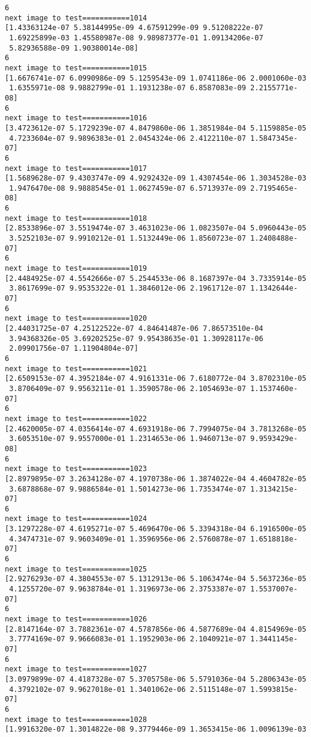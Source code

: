 \documentclass[11pt]{article}
\begin{document}
\begin{Verbatim}[commandchars=\\\{\}]
6
next image to test===========1014
[1.43363124e-07 5.38144995e-09 4.67591299e-09 9.51208222e-07
 1.69225899e-03 1.45580987e-08 9.98987377e-01 1.09134206e-07
 5.82936588e-09 1.90380014e-08]
6
next image to test===========1015
[1.6676741e-07 6.0990986e-09 5.1259543e-09 1.0741186e-06 2.0001060e-03
 1.6355971e-08 9.9882799e-01 1.1931238e-07 6.8587083e-09 2.2155771e-08]
6
next image to test===========1016
[3.4723612e-07 5.1729239e-07 4.8479860e-06 1.3851984e-04 5.1159885e-05
 4.7233604e-07 9.9896383e-01 2.0454324e-06 2.4122110e-07 1.5847345e-07]
6
next image to test===========1017
[1.5689628e-07 9.4303747e-09 4.9292432e-09 1.4307454e-06 1.3034528e-03
 1.9476470e-08 9.9888545e-01 1.0627459e-07 6.5713937e-09 2.7195465e-08]
6
next image to test===========1018
[2.8533896e-07 3.5519474e-07 3.4631023e-06 1.0823507e-04 5.0960443e-05
 3.5252103e-07 9.9910212e-01 1.5132449e-06 1.8560723e-07 1.2408488e-07]
6
next image to test===========1019
[2.4484925e-07 4.5542666e-07 5.2544533e-06 8.1687397e-04 3.7335914e-05
 3.8617699e-07 9.9535322e-01 1.3846012e-06 2.1961712e-07 1.1342644e-07]
6
next image to test===========1020
[2.44031725e-07 4.25122522e-07 4.84641487e-06 7.86573510e-04
 3.94368326e-05 3.69202525e-07 9.95438635e-01 1.30928117e-06
 2.09901756e-07 1.11904804e-07]
6
next image to test===========1021
[2.6509153e-07 4.3952184e-07 4.9161331e-06 7.6180772e-04 3.8702310e-05
 3.8706409e-07 9.9563211e-01 1.3590578e-06 2.1054693e-07 1.1537460e-07]
6
next image to test===========1022
[2.4620005e-07 4.0356414e-07 4.6931918e-06 7.7994075e-04 3.7813268e-05
 3.6053510e-07 9.9557000e-01 1.2314653e-06 1.9460713e-07 9.9593429e-08]
6
next image to test===========1023
[2.8979895e-07 3.2634128e-07 4.1970738e-06 1.3874022e-04 4.4604782e-05
 3.6878868e-07 9.9886584e-01 1.5014273e-06 1.7353474e-07 1.3134215e-07]
6
next image to test===========1024
[3.1297228e-07 4.6195271e-07 5.4696470e-06 5.3394318e-04 6.1916500e-05
 4.3474731e-07 9.9603409e-01 1.3596956e-06 2.5760878e-07 1.6518818e-07]
6
next image to test===========1025
[2.9276293e-07 4.3804553e-07 5.1312913e-06 5.1063474e-04 5.5637236e-05
 4.1255720e-07 9.9638784e-01 1.3196973e-06 2.3753387e-07 1.5537007e-07]
6
next image to test===========1026
[2.8147164e-07 3.7882361e-07 4.5787856e-06 4.5877689e-04 4.8154969e-05
 3.7774169e-07 9.9666083e-01 1.1952903e-06 2.1040921e-07 1.3441145e-07]
6
next image to test===========1027
[3.0979899e-07 4.4187328e-07 5.3705758e-06 5.5791036e-04 5.2806343e-05
 4.3792102e-07 9.9627018e-01 1.3401062e-06 2.5115148e-07 1.5993815e-07]
6
next image to test===========1028
[1.9916320e-07 1.3014822e-08 9.3779446e-09 1.3653415e-06 1.0096139e-03

\end{Verbatim}
\end{document}
